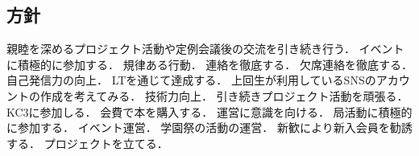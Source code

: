 \subsection*{\newGradeIfKouki{}\secondGrade{}方針}

親睦を深めるプロジェクト活動や定例会議後の交流を引き続き行う．
イベントに積極的に参加する．
規律ある行動．
連絡を徹底する．
欠席連絡を徹底する．
自己発信力の向上．
LTを通じて達成する．
上回生が利用しているSNSのアカウントの作成を考えてみる．
技術力向上．
引き続きプロジェクト活動を頑張る．
KC3に参加しる．
会費で本を購入する．
運営に意識を向ける．
局活動に積極的に参加する．
イベント運営．
学園祭の活動の運営．
新歓により新入会員を勧誘する．
プロジェクトを立てる．

